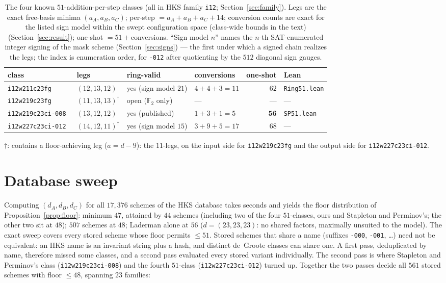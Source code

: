 \documentclass[11pt]{article}
\theoremstyle{definition}
\theoremstyle{remark}
\newcommand{\F}{\mathbb{F}}
\begin{document}
\begin{table}[ht]
\centering
\caption{The four known $51$-addition-per-step classes (all in HKS
family \texttt{i12}; Section~\ref{sec:family}).  Legs are the exact
free-basis minima $(a_A,a_B,a_C)$; per-step $=a_A+a_B+a_C+14$;
conversion counts are exact for the listed sign model within the
swept configuration space (class-wide bounds in the text)
(Section~\ref{sec:result}); one-shot $=51+$conversions.
``Sign model $n$'' names the $n$-th SAT-enumerated integer signing of
the mask scheme (Section~\ref{sec:signs}) --- the first under which a
signed chain realizes the legs; the index is enumeration order, for
\texttt{-012} after quotienting by the $512$ diagonal sign gauges.}
\label{tab:four51}
\small
\begin{tabular}{llllrl}
\toprule
class & legs & ring-valid & conversions & one-shot & Lean\\
\midrule
\texttt{i12w211c23fg} & $(12,13,12)$ & yes (sign model $21$) & $4{+}4{+}3=11$ & $62$ & \texttt{Ring51.lean}\\
\texttt{i12w219c23fg} & $(11,13,13)^{\dagger}$ & open ($\F_2$ only) & --- & --- & ---\\
\texttt{i12w219c23ci-008}~\cite{SP26} & $(13,12,12)$ & yes (published) & $1{+}3{+}1=5$ & $\mathbf{56}$ & \texttt{SP51.lean}\\
\texttt{i12w227c23ci-012} & $(14,12,11)^{\dagger}$ & yes (sign model $15$) & $3{+}9{+}5=17$ & $68$ & ---\\
\bottomrule
\end{tabular}

\smallskip
{\footnotesize $\dagger$: contains a floor-achieving leg ($a=d-9$):
the $11$-legs, on the input side for \texttt{i12w219c23fg} and the
output side for \texttt{i12w227c23ci-012}.}
\end{table}

\section{Database sweep}\label{sec:sweep}

Computing $(d_A,d_B,d_C)$ for all $17{,}376$ schemes of the HKS
database takes seconds and yields the floor distribution of
Proposition~\ref{prop:floor}: minimum $47$, attained by $44$ schemes
(including two of the four $51$-classes, ours and Stapleton and
Perminov's; the other two sit at $48$); $507$ schemes at $48$;
Laderman alone at $56$ ($d=(23,23,23)$: no shared factors, maximally
unsuited to the model).  The exact sweep covers every stored scheme
whose floor permits $\le51$.  Stored schemes that share a name
(suffixes \texttt{-000}, \texttt{-001}, \dots) need not be
equivalent: an HKS name is an invariant string plus a hash, and
distinct de~Groote classes can share one.  A first pass,
deduplicated by name, therefore missed some classes, and a second
pass evaluated every stored variant individually.  The second pass
is where Stapleton and Perminov's class (\texttt{i12w219c23ci-008})
and the fourth $51$-class (\texttt{i12w227c23ci-012}) turned up.
Together the two passes decide all $561$ stored schemes with floor
$\le48$, spanning $23$ families:
\end{document}
